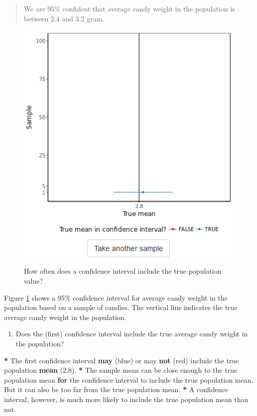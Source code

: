 \documentclass[a4paper]{book}
\newenvironment{Shaded}{\begin{snugshade}}{\end{snugshade}}
\newcommand{\KeywordTok}[1]{\textcolor[rgb]{0,0,0}{\textbf{#1}}}
\newcommand{\FloatTok}[1]{\textcolor[rgb]{0.00,0.00,0.00}{#1}}
\newcommand{\StringTok}[1]{\textcolor[rgb]{0.00,0.00,0.00}{#1}}
\newcommand{\ControlFlowTok}[1]{\textcolor[rgb]{0.00,0.00,0.00}{\textbf{#1}}}
\newcommand{\OperatorTok}[1]{\textcolor[rgb]{0.00,0.00,0.00}{\textbf{#1}}}
\newcommand{\NormalTok}[1]{#1}
\providecommand{\tightlist}{%
  \setlength{\itemsep}{0pt}\setlength{\parskip}{0pt}}
\theoremstyle{definition}
\theoremstyle{definition}
\theoremstyle{definition}
\theoremstyle{remark}
\begin{document}
\begin{quote}
We are 95\% confident that average candy weight in the population is
between 2.4 and 3.2 gram.
\end{quote}

\begin{figure}[H]
\href{http://82.196.4.233:3838/apps/95ci-simul/}{\includegraphics[width=420px]{GentleIntro_files/figure-latex/95ci-simul-1} }\caption{How often does a confidence interval include the true population value?}\label{fig:95ci-simul}
\end{figure}

Figure \ref{fig:95ci-simul} shows a 95\% confidence interval for average
candy weight in the population based on a sample of candies. The
vertical line indicates the true average candy weight in the population.

\begin{enumerate}
\def\labelenumi{\arabic{enumi}.}
\tightlist
\item
  Does the (first) confidence interval include the true average candy
  weight in the population?
\end{enumerate}

\begin{Shaded}
\begin{Highlighting}[]
\OperatorTok{*}\StringTok{ }\NormalTok{The first confidence interval }\KeywordTok{may}\NormalTok{ (blue) or may }\KeywordTok{not}\NormalTok{ (red) include the true}
\NormalTok{population }\KeywordTok{mean}\NormalTok{ (}\FloatTok{2.8}\NormalTok{).}
\OperatorTok{*}\StringTok{ }\NormalTok{The sample mean can be close enough to the true population mean }\ControlFlowTok{for}\NormalTok{ the}
\NormalTok{confidence interval to include the true population mean. But it can also be too}
\NormalTok{far from the true population mean.}
\OperatorTok{*}\StringTok{ }\NormalTok{A confidence interval, however, is much more likely to include the true}
\NormalTok{population mean than not.}
\end{Highlighting}
\end{Shaded}
\end{document}
